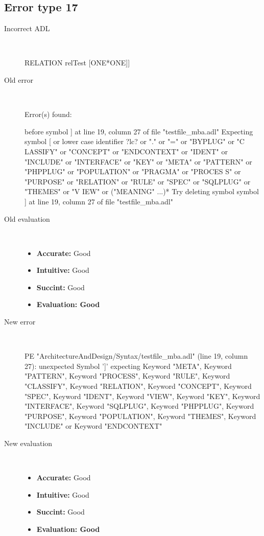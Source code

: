 \subsection{Error type 17}
  \begin{description}
  \item[Incorrect ADL]~\\
\begin{adl}
RELATION relTest [ONE*ONE]]\end{adl}
  \item[Old error]~\\
\begin{haskell}
Error(s) found:

before symbol ] at line 19, column 27 of file "testfile_mba.adl"
Expecting symbol [ or lower case identifier ?lc? or "." or "=" or "BYPLUG" or "C
LASSIFY" or "CONCEPT" or "ENDCONTEXT" or "IDENT" or "INCLUDE" or "INTERFACE" or
"KEY" or "META" or "PATTERN" or "PHPPLUG" or "POPULATION" or "PRAGMA" or "PROCES
S" or "PURPOSE" or "RELATION" or "RULE" or "SPEC" or "SQLPLUG" or "THEMES" or "V
IEW" or ("MEANING" ...)*
Try deleting symbol symbol ] at line 19, column 27 of file "testfile_mba.adl"\end{haskell}
  \item[Old evaluation]~\\
    \begin{itemize}
    \item \textbf{Accurate:} Good
    \item \textbf{Intuitive:} Good
    \item \textbf{Succint:} Good
    \item \textbf{Evaluation: Good}
    \end{itemize}
  \item[New error]~\\
\begin{haskell}
PE "ArchitectureAndDesign/Syntax/testfile_mba.adl" (line 19, column 27):
unexpected Symbol ']'
expecting Keyword "META", Keyword "PATTERN", Keyword "PROCESS", Keyword "RULE", Keyword "CLASSIFY", Keyword "RELATION", Keyword "CONCEPT", Keyword "SPEC", Keyword "IDENT", Keyword "VIEW", Keyword "KEY", Keyword "INTERFACE", Keyword "SQLPLUG", Keyword "PHPPLUG", Keyword "PURPOSE", Keyword "POPULATION", Keyword "THEMES", Keyword "INCLUDE" or Keyword "ENDCONTEXT"
\end{haskell}
  \item[New evaluation]~\\
    \begin{itemize}
    \item \textbf{Accurate:} Good
    \item \textbf{Intuitive:} Good
    \item \textbf{Succint:} Good
    \item \textbf{Evaluation: Good
}
    \end{itemize}
  \end{description}

